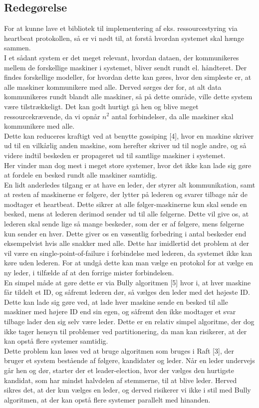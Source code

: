 \documentclass[a4paper,12pt]{article}
\begin{document}
\subsection{Redegørelse}
For at kunne lave et bibliotek til implementering af eks. ressourcestyring via heartbeat protokollen, så er vi nødt til, at forstå hvordan systemet skal hænge sammen.
\\
I et sådant system er det meget relevant, hvordan dataen, der kommunikeres mellem de forskellige maskiner i systemet, bliver sendt rundt el. håndteret.
Der findes forskellige modeller, for hvordan dette kan gøres, hvor den simpleste er, at alle maskiner kommunikere med alle.
Derved sørges der for, at alt data kommunikeres rundt blandt alle maskiner, så på dette område, ville dette system være tilstrækkeligt. 
Det kan godt hurtigt gå hen og blive meget ressourcekrævende, da vi opnår $n^2$ antal forbindelser, da alle maskiner skal kommunikere med alle.
\\[5px]
Dette kan reduceres kraftigt ved at benytte gossiping [4], hvor en maskine skriver ud til en vilkårlig anden maskine, som herefter skriver ud til nogle andre, og så videre indtil beskeden er propageret ud til samtlige maskiner i systemet.
\\
Her vinder man dog mest i meget store systemer, hvor det ikke kan lade sig gøre at fordele en besked rundt alle maskiner samtidig.
\\[5px]
En lidt anderledes tilgang er at have en leder, der styrer alt kommunikation, samt at resten af maskinerne er følgere, der lytter på lederen og svarer tilbage når de modtager et heartbeat. Dette sikrer at alle følger-maskinerne kun skal sende en besked, mens at lederen derimod sender ud til alle følgerne. Dette vil give os, at lederen skal sende lige så mange beskeder, som der er af følgere, mens følgerne kun sender en hver. 
Dette giver os en væsentlig forbedring i antal beskeder end eksempelvist hvis alle snakker med alle. Dette har imidlertid det problem at der vil være en single-point-of-failure i forbindelse med lederen, da systemet ikke kan køre uden lederen. For at undgå dette kan man vælge en protokol for at vælge en ny leder, i tilfælde af at den forrige mister forbindelsen. 
\\[5px]
En simpel måde at gøre dette er via Bully algoritmen [5] hvor i, at hver maskine får tildelt et ID, og såfremt lederen dør, så vælges den leder med det højeste ID. Dette kan lade sig gøre ved, at lade hver maskine sende en besked til alle maskiner med højere ID end sin egen, og såfremt den ikke modtager et svar tilbage lader den sig selv være leder. Dette er en relativ simpel algoritme, der dog ikke tager hensyn til problemer ved partitionering, da man kan risikerer, at der kan opstå flere systemer samtidig. 
\\[5px]
Dette problem kan løses ved at bruge algoritmen som bruges i Raft [3], der bruger et system bestående af følgere, kandidater og leder.
Når en leder undervejs går hen og dør, starter der et leader-election, hvor der vælges den hurtigste kandidat, som har mindst halvdelen af stemmerne, til at blive leder. Herved sikres det, at der kun vælges en leder, og derved risikerer vi ikke i stil med Bully algoritmen, at der kan opstå flere systemer parallelt med hinanden.
\newpage
  
\end{document}

